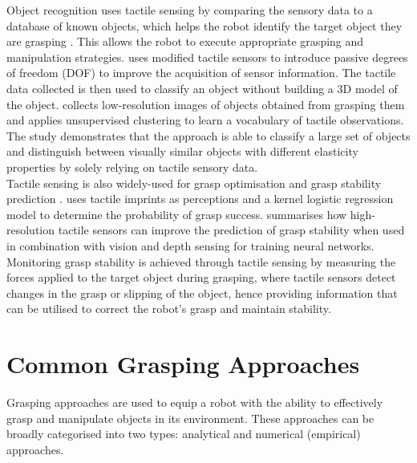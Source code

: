 \documentclass[11pt, a4paper]{report}
\begin{document}
Object recognition uses tactile sensing by comparing the sensory data to a database of known objects, which helps the robot identify the target object they are grasping \cite{5652597, gorges2010, schneider2009}. This allows the robot to execute appropriate grasping and manipulation strategies. \cite{gorges2010} uses modified tactile sensors to introduce passive degrees of freedom (DOF) to improve the acquisition of sensor information. The tactile data collected is then used to classify an object without building a 3D model of the object. \cite{schneider2009} collects low-resolution images of objects obtained from grasping them and applies unsupervised clustering to learn a vocabulary of tactile observations. The study demonstrates that the approach is able to classify a large set of objects and distinguish between visually similar objects with different elasticity properties by solely relying on tactile sensory data.\\

Tactile sensing is also widely-used for grasp optimisation and grasp stability prediction \cite{6094878, chumbley2022integrating, de_Farias_2021, Lambeta2020DIGIT, liu2022gelsight}. \cite{6094878} uses tactile imprints as perceptions and a kernel logistic regression model to determine the probability of grasp success. \cite{chumbley2022integrating} summarises how high-resolution tactile sensors can improve the prediction of grasp stability when used in combination with vision and depth sensing for training neural networks. Monitoring grasp stability \cite{Bekiroglu2012LearningTA, Chebotar_2017, garciagarcia2019tactilegcn, GUO2017274} is achieved through tactile sensing by measuring the forces applied to the target object during grasping, where tactile sensors detect changes in the grasp or slipping of the object, hence providing information that can be utilised to correct the robot's grasp and maintain stability.


\section{Common Grasping Approaches}
\label{sec:2.3}
Grasping approaches are used to equip a robot with the ability to effectively grasp and manipulate objects in its environment. These approaches can be broadly categorised into two types: analytical and numerical (empirical) approaches.\\
\end{document}
